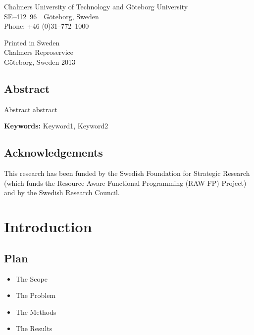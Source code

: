 \documentclass[a4paper]{book}
\newcommand{\uni}{Chalmers University of Technology and G\"oteborg University}
\begin{document}
\vspace{1cm} 

\noindent \uni \\
\noindent SE--412~96~~G\"oteborg, Sweden\\
\noindent Phone: +46 (0)31--772~1000 \\

\vspace{1cm} 

\noindent Printed in Sweden\\
\noindent Chalmers Reproservice\\
\noindent G\"oteborg, Sweden 2013


\thispagestyle{empty}

\clearpage
{}

\section*{Abstract}
Abstract abstract 

\vspace{5mm}

\noindent

 \textbf{Keywords:} Keyword1, Keyword2  

\clearpage

\section*{Acknowledgements}


\vspace{5mm}
This research has been funded by the Swedish Foundation for
Strategic Research (which funds the Resource Aware Functional 
Programming (RAW FP) Project) and by the Swedish Research Council.


\tableofcontents


\cleardoublepage
\clearpage

\pagestyle{fancy}
\fancyfoot{}
\fancyhead[LO]{}
\fancyhead[RO]{\leftmark}
\renewcommand{\headrulewidth}{0.0pt}
\fancyhead[LE,RO]{\thepage}

\chapter{Introduction}

\section{Plan} 
\begin{itemize} 
  \item The Scope
  \item The Problem 
  \item The Methods
  \item The Results 
\end{itemize}
\end{document}
